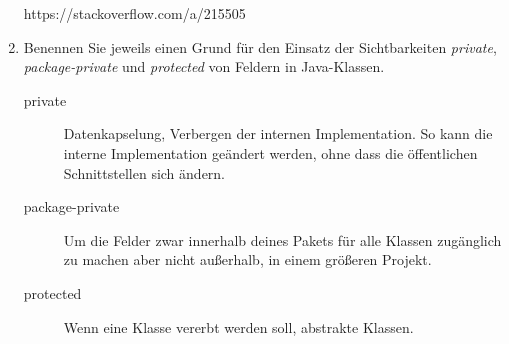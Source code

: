 \documentclass{bschlangaul-aufgabe}
\begin{document}
\begin{enumerate}
\begin{bAntwort}
https://stackoverflow.com/a/215505
\end{bAntwort}


\item Benennen Sie jeweils einen Grund für den Einsatz der
Sichtbarkeiten \emph{private}, \emph{package-private} und
\emph{protected} von Feldern in Java-Klassen.

\begin{bAntwort}
\begin{description}
\item[private]

Datenkapselung, Verbergen der internen Implementation. So kann die
interne Implementation geändert werden, ohne dass die öffentlichen
Schnittstellen sich ändern.

\item[package-private]

Um die Felder zwar innerhalb deines Pakets für alle Klassen zugänglich
zu machen aber nicht außerhalb, \zB in einem größeren Projekt.

\item[protected]

Wenn eine Klasse vererbt werden soll, \zB abstrakte Klassen.
\end{description}
\end{bAntwort}
\end{enumerate}
\end{document}
